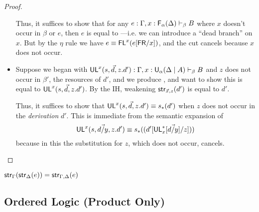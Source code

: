 \begin{proof}
\begin{itemize}
  Thus, it suffices to show that for any $e :
  \Gamma,x:\mathsf{F}_{\alpha}(\Delta) \vdash_{\beta} B$ where $x$ doesn't occur
  in $\beta$ or $e$, then $e$ is equal to ---i.e. we
  can introduce a ``dead branch'' on $x$.  But by the $\eta$ rule we
  have $e \equiv \mathsf{FL}^{x}(e[\mathsf{FR}/x])$, and the cut cancels
  because $x$ does not occur.
  
\item Suppose we began with $\mathsf{UL}^{x}_{}(s,\vec{d},z.d') :
  \Gamma,x:\mathsf{U}_{\alpha}(\Delta \mid A) \vdash_{\beta} B$ and $z$ does not occur
  in $\beta'$, the resources of $d'$, and we produce
  , and want to show this is equal to
  $\mathsf{UL}^{x}_{}(s,\vec{d},z.d')$.  By the IH, weakening
  $\mathsf{str}_{\vec{x},z}(d')$ is equal to $d'$.

  Thus, it suffices to show that $\mathsf{UL}^{x}_{}(s,\vec{d},z.d') \equiv
  s_*(d')$ when $z$ does not occur in the \emph{derivation} $d'$.
  This is immediate from the semantic expansion of \UL{} 
  \[
  \mathsf{UL}^{x}_{}(s,\vec{d/y},z.d') \equiv s_*((d'[\mathsf{UL}^*_{x}[\vec{d/y}]/z]))
  \]
  because in this the substitution for $z$, which does not occur,
  cancels.

\end{itemize}

\end{proof}



\begin{lemma} \label{lem:0-use-strengthening-fusion}
$\mathsf{str}_{\Gamma}(\mathsf{str}_{\Delta}(e)) = \mathsf{str}_{\Gamma,\Delta}(e)$
\end{lemma}

\subsection{Ordered Logic (Product Only)}

